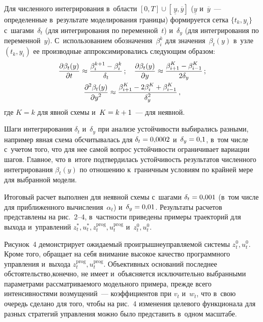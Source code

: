\begin{multicols}{2}
     Для численного интегрирования в~области $[0,T]\cup \left[\, 
\underline{y}, \overline{y}\right]$ ($\underline{y}$ и~$\overline{y}$~--- 
определенные в~результате моделирования границы) формируется сетка 
$\{t_k, y_i\}$ с~шагами~$\delta_t$ (для интегрирования по переменной~$t$) 
и~$\delta_y$ (для интегрирования по переменной~$y$). С~использованием 
обозначения~$\beta_i^k$ для значения~$\beta_t(y)$ в~узле $(t_k, y_i)$ ее 
производные аппроксимировались следующим образом:
     \begin{gather*}
     \displaystyle\frac{\displaystyle \partial \beta_t(y)\mathstrut}{\displaystyle \partial t\mathstrut}\approx \displaystyle\frac{\displaystyle \beta_i^{k+1}-\beta_i^k\mathstrut}{\displaystyle \delta_t\mathstrut}\,;\quad
     \displaystyle\frac{\displaystyle \partial \beta_t(y)\mathstrut}{\displaystyle \partial y\mathstrut}\approx \displaystyle\frac{\displaystyle \beta^K_{i+1}-\beta^K_{i-
1}\mathstrut}{\displaystyle 2\delta_y\mathstrut}\,;\\
     \displaystyle\frac{\displaystyle \partial^2\beta_t(y)\mathstrut}{\displaystyle \partial y^2\mathstrut}\approx \displaystyle\frac{\displaystyle \beta^K_{i+1}-
2\beta_i^K+\beta^K_{i-1}\mathstrut}{\displaystyle \delta_y^2\mathstrut}\,,
     \end{gather*}
где $K=k$ для явной схемы и~$K\hm=k\hm+1$~--- для неявной.
     
     Шаги интегрирования $\delta_t$ и~$\delta_y$ при анализе устойчивости 
выбирались разными, например явная схема обсчитывалась для 
$\delta_t\hm=0{,}0002$ и~$\delta_y\hm=0{,}1$, в~том числе с~учетом того, 
что для нее самой вопрос устойчивости ограничивает вариации шагов. 
Главное, что в~итоге подтвердилась устойчивость результатов численного 
интегрирования $\beta_t(y)$ по отношению к~граничным условиям по 
крайней мере для выбранной модели.
     
     Итоговый расчет выполнен для неявной схемы с~шагами 
$\delta_t\hm=0{,}001$ (в~том числе для приближенного 
вычисления~$\alpha_t$) и~$\delta_y\hm=0{,}01$. Результаты расчетов 
представлены на рис.~2--4, в~частности приведены примеры траекторий для 
выхода и~управлений $z_t^*, u_t^*, z_t^{\mathrm{prog}}, u_t^{\mathrm{prog}}$ и~$z_t^0, u_t^0$.



     Рисунок~4 демонстрирует ожидаемый проигрыш\linebreak неуправляемой 
системы $z_t^0, u_t^0$. Кроме того, обращает на себя внимание высокое 
качество про\-граммного управления и~выхода $z_t^{\mathrm{prog}}, u_t^{\mathrm{prog}}$. 
Объ\-ективных оснований последнее обстоятельство,\linebreak конечно, не имеет 
и~объясняется исключительно выбранными параметрами рассматриваемого 
модельного примера, прежде всего интенсивностями возмущений~--- 
коэффициентов при $v_t$ и~$w_t$, что в~свою очередь сделано для того, чтобы 
на рис.~4 изменения целевого функционала для разных стратегий управ\-ле\-ния 
можно было представить в~одном масштабе.
     

\end{multicols}
